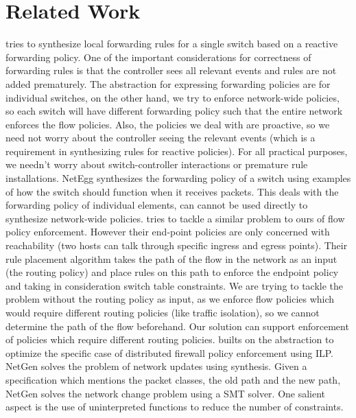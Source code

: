 \documentclass[]{sig}
\begin{document}
\section{Related Work}
\cite{decentralize} tries to synthesize local forwarding rules for a single switch based on a reactive forwarding policy. One of the important considerations for correctness of forwarding rules is that the controller sees all relevant events and rules are not added prematurely. The abstraction for expressing forwarding policies are for individual switches, on the other hand, we try to enforce network-wide policies, so each switch will have different forwarding policy such that the entire network enforces the flow policies. Also, the policies we deal with are proactive, so we need not worry about the controller seeing the relevant events (which is a requirement in synthesizing rules for reactive policies). For all practical purposes, we needn't worry about switch-controller interactions or premature rule installations. \newline
NetEgg \cite{netegg} synthesizes the forwarding policy of a switch using examples of how the switch should function when it receives packets. This deals with the forwarding policy of individual elements, can cannot be used directly to synthesize network-wide policies. \newline
\cite{oneswitch} tries to tackle a similar problem to ours of flow policy enforcement. However their end-point policies are only concerned with reachability (two hosts can talk through specific ingress and egress points). Their rule placement algorithm takes the path of the flow in the network as an input (the routing policy) and place rules on this path to enforce the endpoint policy and taking in consideration switch table constraints. We are trying to tackle the problem without the routing policy as input, as we enforce flow policies which would require different routing policies (like traffic isolation), so we cannot determine the path of the flow beforehand. Our solution can support enforcement of policies which require different routing policies. \cite{distfirewall} builts on the \cite{oneswitch} abstraction to optimize the specific case of distributed firewall policy enforcement using ILP.  \newline
\cite{netgen} NetGen solves the problem of network updates using synthesis. Given a specification which mentions the packet classes, the old path and the new path, NetGen solves the network change problem using a SMT solver. One salient aspect is the use of uninterpreted functions to reduce the number of constraints. 
\end{document}
